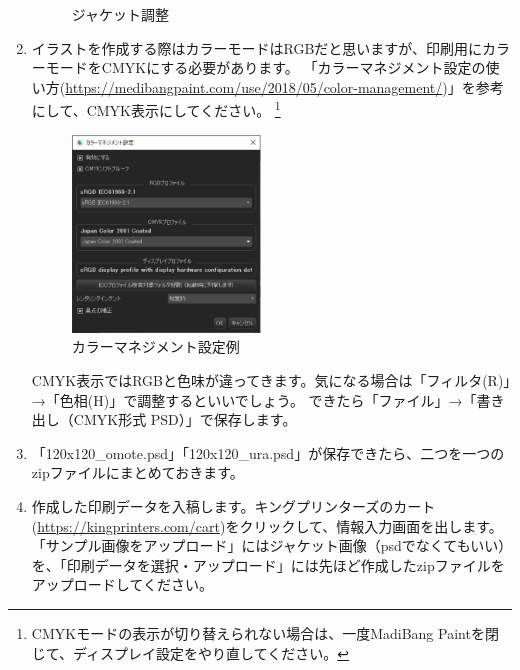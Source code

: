 \documentclass[11pt,a4paper]{jsarticle}
\begin{document}
\begin{enumerate}
\begin{figure}[H]
\begin{center}
                                \caption{ジャケット調整}
                                \label{fig:kinpri03}
                                \end{center}
                           \end{figure}
                    \item イラストを作成する際はカラーモードはRGBだと思いますが、印刷用にカラーモードをCMYKにする必要があります。
                           「カラーマネジメント設定の使い方(\url{https://medibangpaint.com/use/2018/05/color-management/})」を参考にして、CMYK表示にしてください。
                           \footnote{CMYKモードの表示が切り替えられない場合は、一度MadiBang Paintを閉じて、ディスプレイ設定をやり直してください。}
                           \begin{figure}[H]
                                \begin{center}
                                \includegraphics[width=5.0cm]{./image/kinpri04.eps}
                                \caption{カラーマネジメント設定例}
                                \label{fig:kinpri04}
                                \end{center}
                            \end{figure}
                            CMYK表示ではRGBと色味が違ってきます。気になる場合は「フィルタ(R)」→「色相(H)」で調整するといいでしょう。
                            できたら「ファイル」→「書き出し（CMYK形式 PSD）」で保存します。
                    \item 「120x120\_omote.psd」「120x120\_ura.psd」が保存できたら、二つを一つのzipファイルにまとめておきます。
                    \item 作成した印刷データを入稿します。キングプリンターズのカート(\url{https://kingprinters.com/cart})をクリックして、情報入力画面を出します。
                           「サンプル画像をアップロード」にはジャケット画像（psdでなくてもいい）を、「印刷データを選択・アップロード」には先ほど作成したzipファイルをアップロードしてください。

\end{enumerate}
\end{document}

